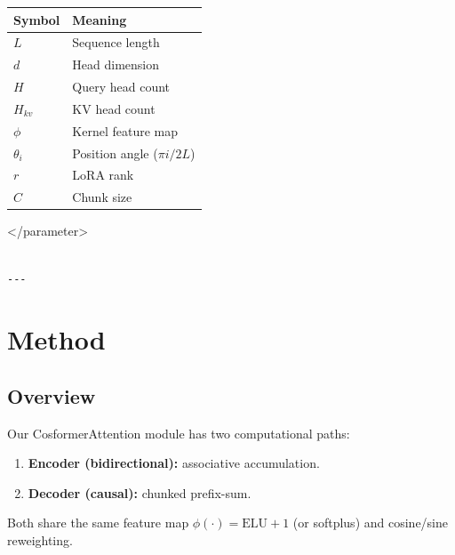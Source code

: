 \begin{table}[H]
\centering
\small
\begin{tabular}{ll}
\toprule
\textbf{Symbol} & \textbf{Meaning} \\
\midrule
$L$ & Sequence length \\
$d$ & Head dimension \\
$H$ & Query head count \\
$H_{kv}$ & KV head count \\
$\phi$ & Kernel feature map \\
$\theta_i$ & Position angle ($\pi i / 2L$) \\
$r$ & LoRA rank \\
$C$ & Chunk size \\
\bottomrule
\end{tabular}
\end{table}
\textless{}/parameter\textgreater{}
\begin{lstlisting}

---
\end{lstlisting}


\section{Method}

\subsection{Overview}

Our CosformerAttention module has two computational paths:

\begin{enumerate}
\item \textbf{Encoder (bidirectional):} associative accumulation.
\item \textbf{Decoder (causal):} chunked prefix-sum.

\end{enumerate}
Both share the same feature map $\phi(\cdot) = \text{ELU} + 1$ (or softplus) 
and cosine/sine reweighting.

